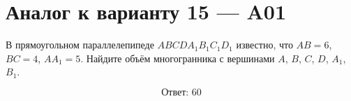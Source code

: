 \documentclass[12pt,a4paper]{article}
\begin{document}
\section*{Аналог к варианту 15 — A01}

В прямоугольном параллелепипеде \(ABCDA_1B_1C_1D_1\) известно, что \(AB=6\), \(BC=4\), \(AA_1=5\). Найдите объём многогранника с вершинами \(A\), \(B\), \(C\), \(D\), \(A_1\), \(B_1\).

\begin{center}
\end{center}

\[
\boxed{\text{Ответ: }60}
\]
\end{document}
